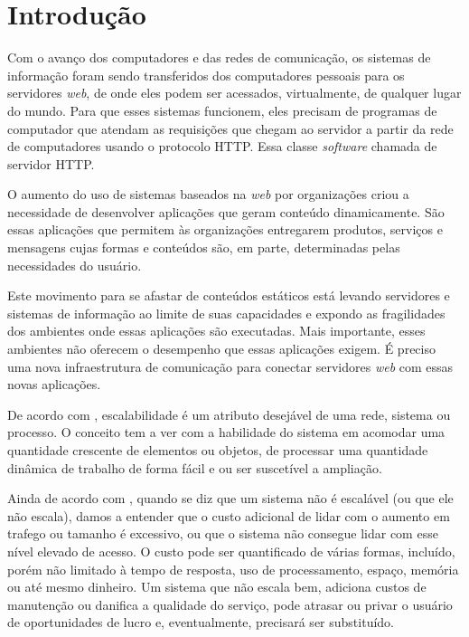 \chapter{Introdução}\label{cap:introducao}
Com o avanço dos computadores e das redes de comunicação, os sistemas de 
informação foram sendo transferidos dos computadores pessoais para os 
servidores \textit{web}, de onde eles podem ser acessados, virtualmente, de 
qualquer lugar do mundo. Para que esses sistemas funcionem, eles precisam de 
programas de computador que atendam as requisições que chegam ao servidor a 
partir da rede de computadores usando o protocolo HTTP. Essa classe 
\textit{software} chamada de servidor HTTP.

O aumento do uso de sistemas baseados na \textit{web} por organizações criou a 
necessidade de desenvolver aplicações que geram conteúdo dinamicamente. São 
essas aplicações que permitem às organizações entregarem produtos, serviços e 
mensagens cujas formas e conteúdos são, em parte, determinadas pelas 
necessidades do usuário.

Este movimento para se afastar de conteúdos estáticos está levando servidores e 
sistemas de informação ao limite de suas capacidades e expondo as fragilidades 
dos ambientes onde essas aplicações são executadas. Mais importante, esses 
ambientes não oferecem o desempenho que essas aplicações exigem. É preciso uma 
nova infraestrutura de comunicação para 
conectar servidores \textit{web} com essas novas aplicações.

De acordo com , escalabilidade é um atributo desejável de 
uma rede, sistema ou processo. O conceito tem a ver com a habilidade do sistema 
em acomodar uma quantidade crescente de elementos ou objetos, de processar 
uma quantidade dinâmica de trabalho de forma fácil e ou ser suscetível a 
ampliação.

Ainda de acordo com , quando se diz que um sistema não é 
escalável (ou que ele não escala), damos a entender que o custo adicional de 
lidar com o aumento em trafego ou tamanho é excessivo, ou que o sistema não 
consegue lidar com esse nível elevado de acesso. O custo pode ser quantificado 
de várias formas, incluído, porém não limitado à tempo de resposta, uso de 
processamento, espaço, memória ou até mesmo dinheiro. Um sistema que não escala 
bem, adiciona custos de manutenção ou danifica a qualidade do serviço, pode 
atrasar ou privar o usuário de oportunidades de lucro e, eventualmente, 
precisará ser substituído.

